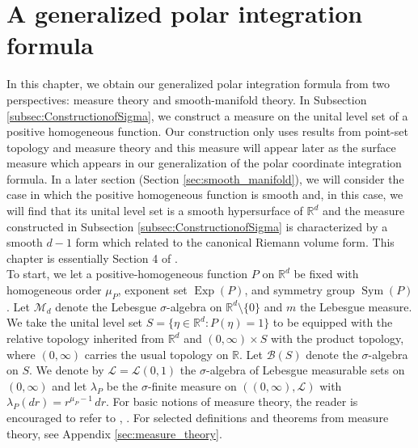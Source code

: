\documentclass[11pt, letter]{book}
\newcommand\Sym{\operatorname{Sym}}
\newcommand\Exp{\operatorname{Exp}}
\begin{document}
\chapter{A generalized polar integration formula}\label{chap:formula}

In this chapter, we obtain our generalized polar integration formula from two perspectives: measure theory and smooth-manifold theory. In Subsection \ref{subsec:ConstructionofSigma}, we construct a measure on the unital level set of a positive homogeneous function. Our construction only uses results from point-set topology and measure theory and this measure will appear later as the surface measure which appears in our generalization of the polar coordinate integration formula. In a later section (Section \ref{sec:smooth_manifold}), we will consider the case in which the positive homogeneous function is smooth and, in this case, we will find that its unital level set is a smooth hypersurface of $\mathbb{R}^d$ and the measure constructed in Subsection \ref{subsec:ConstructionofSigma} is characterized by a smooth $d-1$ form which related to the canonical Riemann volume form. This chapter is essentially Section 4 of \cite{bui2021generalized}.\\

\noindent To start, we let a positive-homogeneous function $P$ on $\mathbb{R}^d$ be fixed with homogeneous order $\mu_P$, exponent set $\Exp(P)$, and symmetry group $\Sym{(P)}$. Let $\mathcal{M}_d$ denote the Lebesgue $\sigma$-algebra on $\mathbb{R}^d\setminus\{ 0 \}$ and $m$ the Lebesgue measure. We take the unital level set $S = \{ \eta\in \mathbb{R}^d : P(\eta) = 1 \}$ to be equipped with the relative topology inherited from $\mathbb{R}^d$ and $(0,\infty)\times S$ with the product topology, where $(0,\infty)$ carries the usual topology on $\mathbb{R}$. Let $\mathcal{B}(S)$ denote the $\sigma$-algebra on $S$. We denote by $\mathcal{L}=\mathcal{L}(0,1)$ the $\sigma$-algebra of Lebesgue measurable sets on $(0,\infty)$ and let $\lambda_P$ be the $\sigma$-finite measure on $((0,\infty),\mathcal{L})$ with $\lambda_P(dr)=r^{\mu_P-1}\,dr$. For basic notions of measure theory, the reader is encouraged to refer to \cite{bogachev_measure_2007}, \cite{stein_real_2009}. For selected definitions and theorems from measure theory, see Appendix \ref{sec:measure_theory}.

\end{document}
